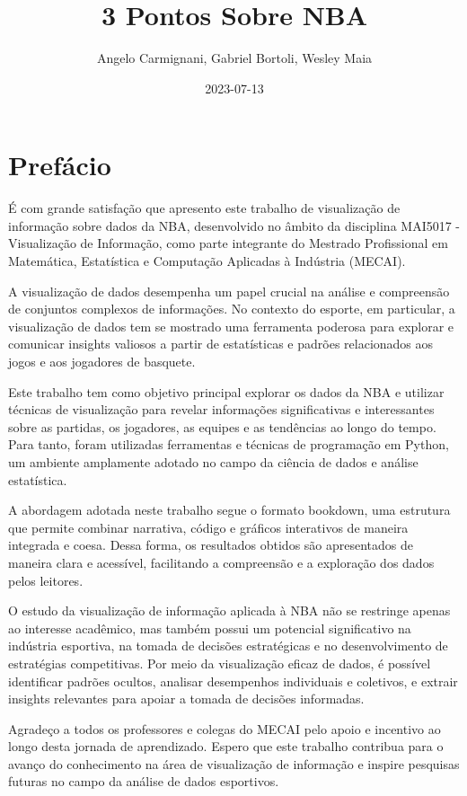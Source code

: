 \documentclass[
]{book}
\title{3 Pontos Sobre NBA}
\author{Angelo Carmignani, Gabriel Bortoli, Wesley Maia}
\date{2023-07-13}
\begin{document}
\maketitle

{
\setcounter{tocdepth}{1}
\tableofcontents
}
\hypertarget{prefuxe1cio}{%
\chapter*{Prefácio}\label{prefuxe1cio}}

É com grande satisfação que apresento este trabalho de visualização de informação sobre dados da NBA, desenvolvido no âmbito da disciplina MAI5017 - Visualização de Informação, como parte integrante do Mestrado Profissional em Matemática, Estatística e Computação Aplicadas à Indústria (MECAI).

A visualização de dados desempenha um papel crucial na análise e compreensão de conjuntos complexos de informações. No contexto do esporte, em particular, a visualização de dados tem se mostrado uma ferramenta poderosa para explorar e comunicar insights valiosos a partir de estatísticas e padrões relacionados aos jogos e aos jogadores de basquete.

Este trabalho tem como objetivo principal explorar os dados da NBA e utilizar técnicas de visualização para revelar informações significativas e interessantes sobre as partidas, os jogadores, as equipes e as tendências ao longo do tempo. Para tanto, foram utilizadas ferramentas e técnicas de programação em Python, um ambiente amplamente adotado no campo da ciência de dados e análise estatística.

A abordagem adotada neste trabalho segue o formato bookdown, uma estrutura que permite combinar narrativa, código e gráficos interativos de maneira integrada e coesa. Dessa forma, os resultados obtidos são apresentados de maneira clara e acessível, facilitando a compreensão e a exploração dos dados pelos leitores.

O estudo da visualização de informação aplicada à NBA não se restringe apenas ao interesse acadêmico, mas também possui um potencial significativo na indústria esportiva, na tomada de decisões estratégicas e no desenvolvimento de estratégias competitivas. Por meio da visualização eficaz de dados, é possível identificar padrões ocultos, analisar desempenhos individuais e coletivos, e extrair insights relevantes para apoiar a tomada de decisões informadas.

Agradeço a todos os professores e colegas do MECAI pelo apoio e incentivo ao longo desta jornada de aprendizado. Espero que este trabalho contribua para o avanço do conhecimento na área de visualização de informação e inspire pesquisas futuras no campo da análise de dados esportivos.
\end{document}
